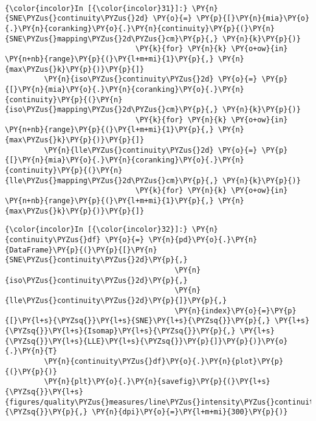     \begin{center}
    \end{center}
    { \hspace*{\fill} \\}

    \begin{Verbatim}[commandchars=\\\{\}]
{\color{incolor}In [{\color{incolor}31}]:} \PY{n}{SNE\PYZus{}continuity\PYZus{}2d} \PY{o}{=} \PY{p}{[}\PY{n}{mia}\PY{o}{.}\PY{n}{coranking}\PY{o}{.}\PY{n}{continuity}\PY{p}{(}\PY{n}{SNE\PYZus{}mapping\PYZus{}2d\PYZus{}cm}\PY{p}{,} \PY{n}{k}\PY{p}{)}
                              \PY{k}{for} \PY{n}{k} \PY{o+ow}{in} \PY{n+nb}{range}\PY{p}{(}\PY{l+m+mi}{1}\PY{p}{,} \PY{n}{max\PYZus{}k}\PY{p}{)}\PY{p}{]}
         \PY{n}{iso\PYZus{}continuity\PYZus{}2d} \PY{o}{=} \PY{p}{[}\PY{n}{mia}\PY{o}{.}\PY{n}{coranking}\PY{o}{.}\PY{n}{continuity}\PY{p}{(}\PY{n}{iso\PYZus{}mapping\PYZus{}2d\PYZus{}cm}\PY{p}{,} \PY{n}{k}\PY{p}{)}
                              \PY{k}{for} \PY{n}{k} \PY{o+ow}{in} \PY{n+nb}{range}\PY{p}{(}\PY{l+m+mi}{1}\PY{p}{,} \PY{n}{max\PYZus{}k}\PY{p}{)}\PY{p}{]}
         \PY{n}{lle\PYZus{}continuity\PYZus{}2d} \PY{o}{=} \PY{p}{[}\PY{n}{mia}\PY{o}{.}\PY{n}{coranking}\PY{o}{.}\PY{n}{continuity}\PY{p}{(}\PY{n}{lle\PYZus{}mapping\PYZus{}2d\PYZus{}cm}\PY{p}{,} \PY{n}{k}\PY{p}{)}
                              \PY{k}{for} \PY{n}{k} \PY{o+ow}{in} \PY{n+nb}{range}\PY{p}{(}\PY{l+m+mi}{1}\PY{p}{,} \PY{n}{max\PYZus{}k}\PY{p}{)}\PY{p}{]}
\end{Verbatim}

    \begin{Verbatim}[commandchars=\\\{\}]
{\color{incolor}In [{\color{incolor}32}]:} \PY{n}{continuity\PYZus{}df} \PY{o}{=} \PY{n}{pd}\PY{o}{.}\PY{n}{DataFrame}\PY{p}{(}\PY{p}{[}\PY{n}{SNE\PYZus{}continuity\PYZus{}2d}\PY{p}{,}
                                       \PY{n}{iso\PYZus{}continuity\PYZus{}2d}\PY{p}{,}
                                       \PY{n}{lle\PYZus{}continuity\PYZus{}2d}\PY{p}{]}\PY{p}{,}
                                       \PY{n}{index}\PY{o}{=}\PY{p}{[}\PY{l+s}{\PYZsq{}}\PY{l+s}{SNE}\PY{l+s}{\PYZsq{}}\PY{p}{,} \PY{l+s}{\PYZsq{}}\PY{l+s}{Isomap}\PY{l+s}{\PYZsq{}}\PY{p}{,} \PY{l+s}{\PYZsq{}}\PY{l+s}{LLE}\PY{l+s}{\PYZsq{}}\PY{p}{]}\PY{p}{)}\PY{o}{.}\PY{n}{T}
         \PY{n}{continuity\PYZus{}df}\PY{o}{.}\PY{n}{plot}\PY{p}{(}\PY{p}{)}
         \PY{n}{plt}\PY{o}{.}\PY{n}{savefig}\PY{p}{(}\PY{l+s}{\PYZsq{}}\PY{l+s}{figures/quality\PYZus{}measures/line\PYZus{}intensity\PYZus{}continuity\PYZus{}2d.png}\PY{l+s}{\PYZsq{}}\PY{p}{,} \PY{n}{dpi}\PY{o}{=}\PY{l+m+mi}{300}\PY{p}{)}
\end{Verbatim}

